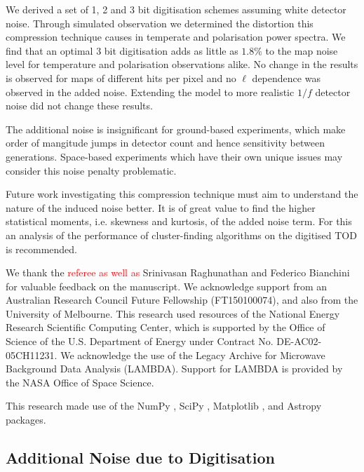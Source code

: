 \documentclass[apj]{emulateapj}
\newcommand{\changed}[1]{\textcolor{Red}{#1}}
\begin{document}
We derived a set of 1, 2 and 3 bit digitisation schemes assuming white detector noise. Through simulated observation we determined the distortion this compression technique causes in temperate and polarisation power spectra. We find that an optimal 3 bit digitisation adds as little as $1.8\%$ to the map noise level for temperature and polarisation observations alike. No change in the results is observed for maps of different hits per pixel and no $\ell$ dependence was observed in the added noise. Extending the model to more realistic $1/f$ detector noise did not change these results.

The additional noise is insignificant for ground-based experiments, which make order of mangitude jumps in detector count and hence sensitivity between generations. Space-based experiments which have their own unique issues may consider this noise penalty problematic.

Future work investigating this compression technique must aim to understand the nature of the induced noise better. It is of great value to find the higher statistical moments, i.e. skewness and kurtosis, of the added noise term. For this an analysis of the performance of cluster-finding algorithms on the digitised TOD is recommended.

\acknowledgments %


We thank the \changed{referee as well as} Srinivasan Raghunathan and Federico Bianchini for valuable feedback on the manuscript. 
We acknowledge support from an Australian Research Council Future Fellowship (FT150100074), and also from the University of Melbourne. 
This research used resources of the National Energy Research Scientific Computing Center, which is supported by the Office of Science of the U.S. Department of Energy under Contract No. DE-AC02-05CH11231. 
We acknowledge the use of the Legacy Archive for Microwave Background Data Analysis (LAMBDA). Support for LAMBDA is provided by the NASA Office of Space Science.


This research made use of the NumPy \citep{numpy}, SciPy \citep{scipy}, Matplotlib \citep{matplotlib}, and Astropy \citep{astropy} packages.

\newpage

\appendix

\subsection{Additional Noise due to Digitisation}
\label{subsec:appendixnoisetables}
\end{document}
